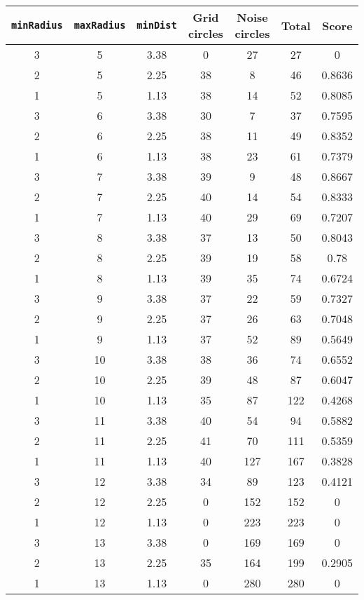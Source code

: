 \documentclass[letterpaper, 12pt]{article}
\begin{document}
\begin{longtable}{|c|c|c|c|c|c|c|}
\hline
\textbf{\texttt{minRadius}} & \textbf{\texttt{maxRadius}} & \textbf{\texttt{minDist}} & \textbf{Grid circles} & \textbf{Noise circles} & \textbf{Total} & \textbf{Score} \\
\hline
3 & 5 & 3.38 & 0 & 27 & 27 & 0 \\
\hline
2 & 5 & 2.25 & 38 & 8 & 46 & 0.8636 \\
\hline
1 & 5 & 1.13 & 38 & 14 & 52 & 0.8085 \\
\hline
3 & 6 & 3.38 & 30 & 7 & 37 & 0.7595 \\
\hline
2 & 6 & 2.25 & 38 & 11 & 49 & 0.8352 \\
\hline
1 & 6 & 1.13 & 38 & 23 & 61 & 0.7379 \\
\hline
3 & 7 & 3.38 & 39 & 9 & 48 & 0.8667 \\
\hline
2 & 7 & 2.25 & 40 & 14 & 54 & 0.8333 \\
\hline
1 & 7 & 1.13 & 40 & 29 & 69 & 0.7207 \\
\hline
3 & 8 & 3.38 & 37 & 13 & 50 & 0.8043 \\
\hline
2 & 8 & 2.25 & 39 & 19 & 58 & 0.78 \\
\hline
1 & 8 & 1.13 & 39 & 35 & 74 & 0.6724 \\
\hline
3 & 9 & 3.38 & 37 & 22 & 59 & 0.7327 \\
\hline
2 & 9 & 2.25 & 37 & 26 & 63 & 0.7048 \\
\hline
1 & 9 & 1.13 & 37 & 52 & 89 & 0.5649 \\
\hline
3 & 10 & 3.38 & 38 & 36 & 74 & 0.6552 \\
\hline
2 & 10 & 2.25 & 39 & 48 & 87 & 0.6047 \\
\hline
1 & 10 & 1.13 & 35 & 87 & 122 & 0.4268 \\
\hline
3 & 11 & 3.38 & 40 & 54 & 94 & 0.5882 \\
\hline
2 & 11 & 2.25 & 41 & 70 & 111 & 0.5359 \\
\hline
1 & 11 & 1.13 & 40 & 127 & 167 & 0.3828 \\
\hline
3 & 12 & 3.38 & 34 & 89 & 123 & 0.4121 \\
\hline
2 & 12 & 2.25 & 0 & 152 & 152 & 0 \\
\hline
1 & 12 & 1.13 & 0 & 223 & 223 & 0 \\
\hline
3 & 13 & 3.38 & 0 & 169 & 169 & 0 \\
\hline
2 & 13 & 2.25 & 35 & 164 & 199 & 0.2905 \\
\hline
1 & 13 & 1.13 & 0 & 280 & 280 & 0 \\

\end{longtable}
\end{document}
